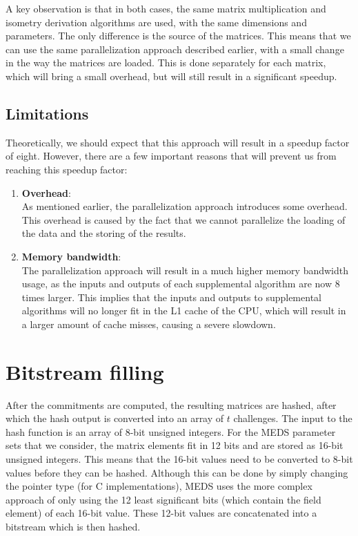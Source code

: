 \documentclass[11pt,a4paper]{report}
\theoremstyle{definition}
\begin{document}
A key observation is that in both cases, the same matrix multiplication and isometry derivation algorithms are used, with the same dimensions and parameters. The only difference is the source of the matrices. This means that we can use the same parallelization approach described earlier, with a small change in the way the matrices are loaded. This is done separately for each matrix, which will bring a small overhead, but will still result in a significant speedup.

\subsection{Limitations}
\label{sec:highlevellimitations}
Theoretically, we should expect that this approach will result in a speedup factor of eight. However, there are a few important reasons that will prevent us from reaching this speedup factor:
\begin{enumerate}
  \item \textbf{Overhead}:\\
        As mentioned earlier, the parallelization approach introduces some overhead. This overhead is caused by the fact that we cannot parallelize the loading of the data and the storing of the results.
  \item \textbf{Memory bandwidth}:\\
        The parallelization approach will result in a much higher memory bandwidth usage, as the inputs and outputs of each supplemental algorithm are now 8 times larger. This implies that the inputs and outputs to supplemental algorithms will no longer fit in the L1 cache of the CPU, which will result in a larger amount of cache misses, causing a severe slowdown.
\end{enumerate}

\section{Bitstream filling}
\label{sec:bitstreamfilling}
After the commitments are computed, the resulting matrices are hashed, after which the hash output is converted into an array of $t$ challenges. The input to the hash function is an array of 8-bit unsigned integers. For the MEDS parameter sets that we consider, the matrix elements fit in 12 bits and are stored as 16-bit unsigned integers. This means that the 16-bit values need to be converted to 8-bit values before they can be hashed. Although this can be done by simply changing the pointer type (for C implementations), MEDS uses the more complex approach of only using the 12 least significant bits (which contain the field element) of each 16-bit value. These 12-bit values are concatenated into a bitstream which is then hashed.
\end{document}
